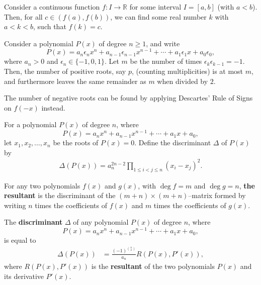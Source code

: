 \begin{theorem}
    Consider a continuous function $f : I \to\mathbb R$ for some interval $I = [a, b]$ (with $a < b$). Then, for all $c \in (f(a), f(b))$, we can find some real number $k$ with $a < k < b$, such that $f(k) = c$.
\end{theorem}


\begin{theorem}
    Consider a polynomial $P(x)$ of degree $n \geq 1$, and write
    \[P(x) = a_n\epsilon_nx^n + a_{n-1}\epsilon_{n-1}x^{n-1} + \cdots + a_1\epsilon_1x + a_0\epsilon_0,\]
    where $a_n > 0$ and $\epsilon_n \in \{-1, 0, 1\}$. Let $m$ be the number of times $\epsilon_k\epsilon_{k-1}=-1$. Then, the number of positive roots, say $p$, (counting multiplicities) is at most $m$, and furthermore leaves the same remainder as $m$ when divided by $2$.
\end{theorem}

\begin{corollary}
The number of negative roots can be found by applying Descartes' Rule of Signs on $f(-x)$ instead.
\end{corollary}

\begin{definition}
    For a polynomial $P(x)$ of degree $n$, where
    \[P(x) = a_nx^n + a_{n-1}x^{n-1} + \cdots + a_1x + a_0,\]
    let $x_1,x_2,\ldots,x_n$ be the roots of $P(x)=0$. Define the discriminant $\Delta$ of $P(x)$ by
    \begin{align*}
        \Delta(P(x))=a_n^{2n-2} \prod_{1\leq i<j \leq n } (x_i-x_j)^2.
    \end{align*}
\end{definition}


\begin{definition}
    For any two polynomials $f(x)$ and $g(x)$, with $\deg f = m$ and $\deg g = n$, \textbf{the resultant} is the discriminant of the $(m + n) \times (m + n)$--matrix formed by writing $n$ times the coefficients of $f(x)$ and $m$ times the coefficients of $g(x)$.
\end{definition}

\begin{theorem}
    The \textbf{discriminant} $\Delta$ of any polynomial $P(x)$ of degree $n$, where
    \[P(x) = a_nx^n + a_{n-1}x^{n-1} + \cdots + a_1x + a_0,\]
    is equal to
    \begin{align*}
        \Delta(P(x)) &= \frac{(-1)^{\binom{n}{2}}}{a_n}R(P(x), P'(x)),
    \end{align*}
    where $R(P(x),P'(x))$ is the \textbf{resultant} of the two polynomials $P(x)$ and its derivative $P'(x)$.
\end{theorem}

